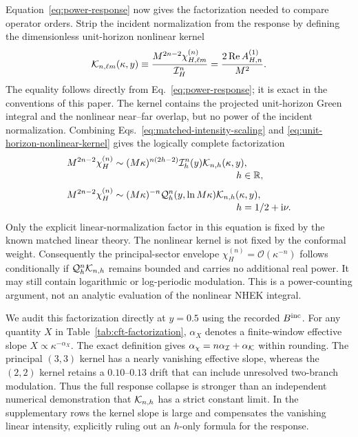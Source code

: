 \documentclass[aps,prd,twocolumn,10pt,nofootinbib,superscriptaddress,floatfix]{revtex4-2}
\newcommand{\ii}{\mathrm{i}}
\newcommand{\calO}{\mathcal{O}}
\begin{document}
Equation~\eqref{eq:power-response} now gives the factorization needed to
compare operator orders.  Strip the incident normalization from the response by defining
the dimensionless unit-horizon nonlinear kernel
\begin{equation}
 {\cal K}_{n,\ell m}(\kappa,y)
 \equiv
 \frac{M^{2n-2}\chi_{H,\ell m}^{(n)}}{{\cal I}_H^n}
 =\frac{2\operatorname{Re}A_{H,n}^{(1)}}{M^2}.
 \label{eq:unit-horizon-nonlinear-kernel}
\end{equation}
The equality follows directly from Eq.~\eqref{eq:power-response}; it is exact
in the conventions of this paper.  The kernel contains the projected
unit-horizon Green integral and the nonlinear near--far overlap, but no power
of the incident normalization.  Combining Eqs.~\eqref{eq:matched-intensity-scaling}
and \eqref{eq:unit-horizon-nonlinear-kernel} gives the logically complete
factorization
\begin{equation}
 \begin{aligned}
 M^{2n-2}\chi_H^{(n)}
 &\sim (M\kappa)^{n(2h-2)}{\cal I}_h^n(y)
 {\cal K}_{n,h}(\kappa,y),\\[-2pt]
 &\hspace{4.5cm}h\in\mathbb{R},\\[2pt]
 M^{2n-2}\chi_H^{(n)}
 &\sim (M\kappa)^{-n}{\cal Q}_h^n(y,\ln M\kappa)
 {\cal K}_{n,h}(\kappa,y),\\[-2pt]
 &\hspace{4.5cm}h=1/2+\ii\nu.
 \end{aligned}
 \label{eq:cft-factorized-response}
\end{equation}
Only the explicit linear-normalization factor in this equation is fixed by
the known matched linear theory.  The nonlinear kernel is not fixed by the
conformal weight.  Consequently the principal-sector envelope
$\chi_H^{(n)}=\calO(\kappa^{-n})$ follows conditionally if
${\cal Q}_h^n{\cal K}_{n,h}$ remains bounded and carries no additional real
power.  It may still contain logarithmic or log-periodic modulation.  This is
a power-counting argument, not an analytic evaluation of the nonlinear NHEK
integral.

We audit this factorization directly at $y=0.5$ using the recorded
$B^{\rm inc}$.  For any quantity $X$ in Table~\ref{tab:cft-factorization},
$\alpha_X$ denotes a finite-window effective slope
$X\propto\kappa^{-\alpha_X}$.  The exact definition gives
$\alpha_\chi=n\alpha_{\cal I}+\alpha_{\cal K}$ within rounding.  The
principal $(3,3)$ kernel has a nearly vanishing effective slope, whereas the
$(2,2)$ kernel retains a $0.10$--$0.13$ drift that can include unresolved
two-branch modulation.  Thus the full response collapse is stronger than an
independent numerical demonstration that ${\cal K}_{n,h}$ has a strict
constant limit.  In the supplementary rows the kernel slope is large and
compensates the vanishing linear intensity, explicitly ruling out an
$h$-only formula for the response.
\end{document}
